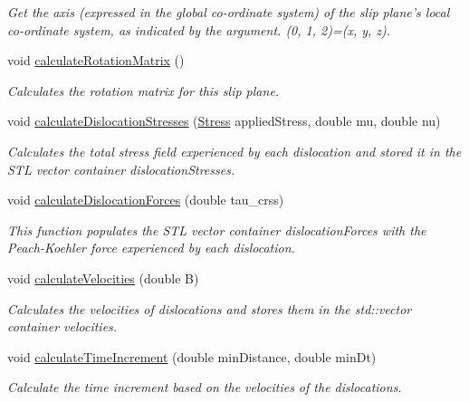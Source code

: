\begin{DoxyCompactItemize}
\begin{DoxyCompactList}\small\item\em Get the axis (expressed in the global co-\/ordinate system) of the slip plane's local co-\/ordinate system, as indicated by the argument. (0, 1, 2)=(x, y, z). \end{DoxyCompactList}\item 
void \hyperlink{classSlipPlane_a5d9054f21be225f50860ad1351e3a86f}{calculate\-Rotation\-Matrix} ()
\begin{DoxyCompactList}\small\item\em Calculates the rotation matrix for this slip plane. \end{DoxyCompactList}\item 
void \hyperlink{classSlipPlane_a2d4d2d031502d4a6f0aebbad0990b882}{calculate\-Dislocation\-Stresses} (\hyperlink{classStress}{Stress} applied\-Stress, double mu, double nu)
\begin{DoxyCompactList}\small\item\em Calculates the total stress field experienced by each dislocation and stored it in the S\-T\-L vector container dislocation\-Stresses. \end{DoxyCompactList}\item 
void \hyperlink{classSlipPlane_ac16d1abbbc3b938b6f1f29a33a70212d}{calculate\-Dislocation\-Forces} (double tau\-\_\-crss)
\begin{DoxyCompactList}\small\item\em This function populates the S\-T\-L vector container dislocation\-Forces with the Peach-\/\-Koehler force experienced by each dislocation. \end{DoxyCompactList}\item 
void \hyperlink{classSlipPlane_aff7af69ba5235da6c8b142193509683c}{calculate\-Velocities} (double B)
\begin{DoxyCompactList}\small\item\em Calculates the velocities of dislocations and stores them in the std\-::vector container velocities. \end{DoxyCompactList}\item 
void \hyperlink{classSlipPlane_a5418245f8c716d4a35405d68db53bc66}{calculate\-Time\-Increment} (double min\-Distance, double min\-Dt)
\begin{DoxyCompactList}\small\item\em Calculate the time increment based on the velocities of the dislocations. \end{DoxyCompactList}\item 

\end{DoxyCompactItemize}
